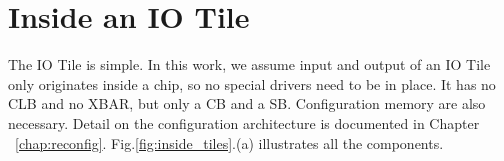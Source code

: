 \section{Inside an IO Tile}
\label{sec:pit-io-tile}

The IO Tile is simple. In this work, we assume input and output of an IO Tile only originates inside a chip, so no special drivers need to be
in place. It has no CLB and no XBAR, but only a CB and a SB. Configuration memory are also necessary. Detail
on the configuration architecture is documented in Chapter ~\ref{chap:reconfig}. Fig.\ref{fig:inside_tiles}.(a) illustrates all the components. \par

